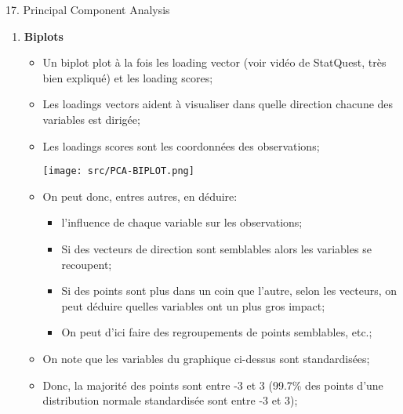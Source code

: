 \documentclass[12pt, titlepage, french]{report}
\begin{document}
\begin{CHPT_SUMM}[label = {PCA-PCA}]{17. Principal Component Analysis}
\begin{enumerate}
\begin{itemize}
			\begin{align*}
			z_{k1}	&=	\sum_{j = 1}^{p} \phi_{j1} x_{kj}, \ k = 1, \dots, n
			\end{align*}
		\item	Donc, chaque composante principale trouvé avec est une \textit{combinaison linéaire} des $p$ features;
		\item	Alors on \textit{réduit les \textbf{dimensions}}, le nombre de variables, avec des \textit{\textbf{combinaisons} des variables} existantes corrélées;
		\item[]	En contraste, Ridge \textit{réduit les \textbf{coefficients}} des variables corrélées;
		\item	Le plus faible le \textit{score}, le plus corrélé ou près les points;
		\item 	Cependant, il peut s'avérer compliqué d'interpréter juste des chiffres et donc nous avons le \textit{biplot};
		\end{itemize}
	\item	\textbf{Biplots}
	\begin{itemize}
		\item	Un biplot plot à la fois les loading vector (voir vidéo de StatQuest, très bien expliqué) et les loading scores;
		\item[]	Les loadings vectors aident à visualiser dans quelle direction chacune des variables est dirigée;
		\item[]	Les loadings scores sont les coordonnées des observations;
		
		\texttt{[image: src/PCA-BIPLOT.png]}
		\item	On peut donc, entres autres, en déduire:
			\begin{itemize}
			\item	l'influence de chaque variable sur les observations;
			\item	Si des vecteurs de direction sont semblables alors les variables se recoupent;
			\item	Si des points sont plus dans un coin que l'autre, selon les vecteurs, on peut déduire quelles variables ont un plus gros impact;
			\item	On peut d'ici faire des regroupements de points semblables, etc.;
			\end{itemize}
		\item	On note que les variables du graphique ci-dessus sont standardisées;
		\item[]	Donc, la majorité des points sont entre -3 et 3 (99.7\% des points d'une distribution normale standardisée sont entre -3 et 3);
		

\end{itemize}
\end{enumerate}
\end{CHPT_SUMM}
\end{document}
